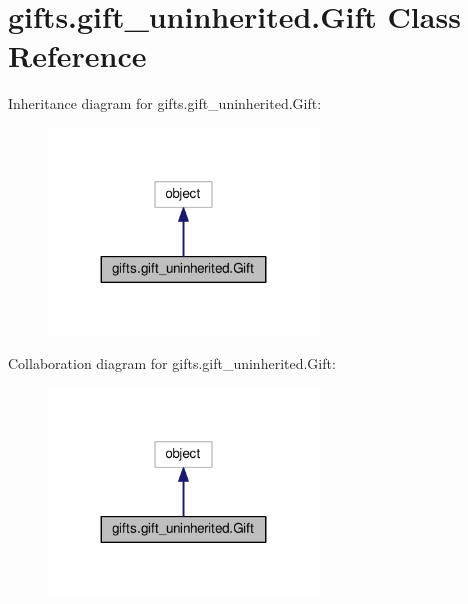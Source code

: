 \hypertarget{classgifts_1_1gift__uninherited_1_1_gift}{}\section{gifts.\+gift\+\_\+uninherited.\+Gift Class Reference}
\label{classgifts_1_1gift__uninherited_1_1_gift}


Inheritance diagram for gifts.\+gift\+\_\+uninherited.\+Gift\+:
\nopagebreak
\begin{figure}[H]
\begin{center}
\leavevmode
\includegraphics[width=203pt]{classgifts_1_1gift__uninherited_1_1_gift__inherit__graph}
\end{center}
\end{figure}


Collaboration diagram for gifts.\+gift\+\_\+uninherited.\+Gift\+:
\nopagebreak
\begin{figure}[H]
\begin{center}
\leavevmode
\includegraphics[width=203pt]{classgifts_1_1gift__uninherited_1_1_gift__coll__graph}
\end{center}
\end{figure}
